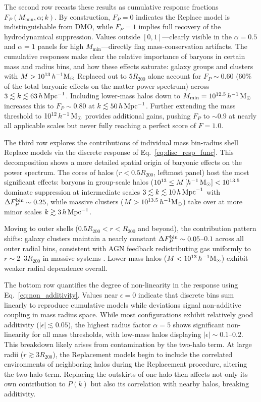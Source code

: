 \documentclass[linenumbers,trackchanges]{aastex701}
\begin{document}
The second row recasts these results as cumulative response fractions $F_P(M_{\min}, \alpha; k)$. By construction, $F_P = 0$ indicates the Replace model is indistinguishable from DMO, while $F_P = 1$ implies full recovery of the hydrodynamical suppression. Values outside $[0,1]$—clearly visible in the $\alpha=0.5$ and $\alpha=1$ panels for high $M_{\min}$—directly flag mass-conservation artifacts. The cumulative responses make clear the relative importance of baryons in certain mass and radius bins, and how these effects saturate: galaxy groups and clusters with $M > 10^{13}\,h^{-1}{\rm M}_\odot$ Replaced out to $5R_{200}$ alone account for $F_P \sim 0.60$ (60\% of the total baryonic effects on the matter power spectrum) across $3 \lesssim k \lesssim 63\,h\,{\rm Mpc}^{-1}$. Including lower-mass halos down to $M_{\min} = 10^{12.5}\,h^{-1}\,{\rm M}_\odot$ increases this to $F_P \sim 0.80$ at $k \lesssim 50\,h\,{\rm Mpc}^{-1}$. Further extending the mass threshold to $10^{12}\,h^{-1}\,{\rm M}_\odot$ provides additional gains, pushing $F_P$ to $\sim 0.9$ at nearly all applicable scales but never fully reaching a perfect score of $F=1.0$.

The third row explores the contributions of individual mass bin-radius shell Replace models via the discrete response of Eq.~\eqref{eq:disc_resp_func}. This decomposition shows a more detailed spatial origin of baryonic effects on the power spectrum. The cores of halos ($r < 0.5R_{200}$, leftmost panel) host the most significant effects: baryons in group-scale halos ($10^{13} \leq M\,[h^{-1}\,{\rm M}_\odot] < 10^{13.5}$ dominate suppression at intermediate scales $3 \lesssim k \lesssim 10\,h\,{\rm Mpc}^{-1}$ with $\Delta F_P^{\rm bin} \sim 0.25$, while massive clusters ($M > 10^{13.5}\,h^{-1}{\rm M}_\odot$) take over at more minor scales $k \gtrsim 3\,h\,{\rm Mpc}^{-1}$.

Moving to outer shells ($0.5R_{200} < r < R_{200}$ and beyond), the contribution pattern shifts: galaxy clusters maintain a nearly constant $\Delta F_P^{\rm bin} \sim 0.05$–$0.1$ across all outer radial bins, consistent with AGN feedback redistributing gas uniformly to $r \sim 2$–$3R_{200}$ in massive systems \citep{Ayromlou23}. Lower-mass halos ($M < 10^{13}\,h^{-1}{\rm M}_\odot$) exhibit weaker radial dependence overall.

The bottom row quantifies the degree of non-linearity in the response using Eq.~\eqref{eq:non_additivity}. Values near $\epsilon = 0$ indicate that discrete bins sum linearly to reproduce cumulative models while deviations signal non-additive coupling in mass radius space. While most configurations exhibit relatively good additivity ($|\epsilon| \lesssim 0.05$), the highest radius factor $\alpha = 5$ shows significant non-linearity for all mass thresholds, with low-mass halos displaying $|\epsilon| \sim 0.1$–$0.2$. This breakdown likely arises from contamination by the two-halo term. At large radii ($r \gtrsim 3R_{200}$), the Replacement models begin to include the correlated environments of neighboring halos during the Replacement procedure, altering the two-halo term.  Replacing the outskirts of one halo then affects not only its own contribution to $P(k)$ but also its correlation with nearby halos, breaking additivity.
\end{document}
